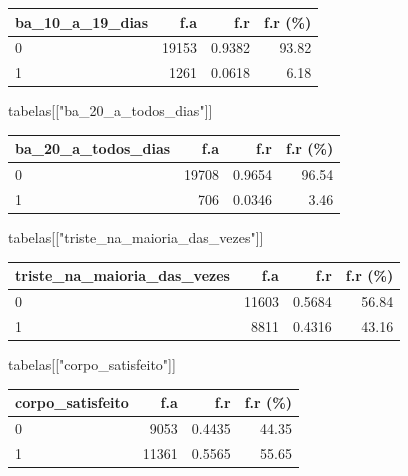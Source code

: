 \documentclass[
]{article}
\newenvironment{Shaded}{\begin{snugshade}}{\end{snugshade}}
\newcommand{\NormalTok}[1]{\textcolor[rgb]{0.00,0.23,0.31}{#1}}
\newcommand{\StringTok}[1]{\textcolor[rgb]{0.13,0.47,0.30}{#1}}
\begin{document}
\begin{longtable}[]{@{}lrrr@{}}
\toprule()
ba\_10\_a\_19\_dias & f.a & f.r & f.r (\%) \\
\midrule()
\endhead
0 & 19153 & 0.9382 & 93.82 \\
1 & 1261 & 0.0618 & 6.18 \\
\bottomrule()
\end{longtable}

\begin{Shaded}
\begin{Highlighting}[]
\NormalTok{tabelas[[}\StringTok{"ba\_20\_a\_todos\_dias"}\NormalTok{]]}
\end{Highlighting}
\end{Shaded}

\begin{longtable}[]{@{}lrrr@{}}
\toprule()
ba\_20\_a\_todos\_dias & f.a & f.r & f.r (\%) \\
\midrule()
\endhead
0 & 19708 & 0.9654 & 96.54 \\
1 & 706 & 0.0346 & 3.46 \\
\bottomrule()
\end{longtable}

\begin{Shaded}
\begin{Highlighting}[]
\NormalTok{tabelas[[}\StringTok{"triste\_na\_maioria\_das\_vezes"}\NormalTok{]]}
\end{Highlighting}
\end{Shaded}

\begin{longtable}[]{@{}lrrr@{}}
\toprule()
triste\_na\_maioria\_das\_vezes & f.a & f.r & f.r (\%) \\
\midrule()
\endhead
0 & 11603 & 0.5684 & 56.84 \\
1 & 8811 & 0.4316 & 43.16 \\
\bottomrule()
\end{longtable}

\begin{Shaded}
\begin{Highlighting}[]
\NormalTok{tabelas[[}\StringTok{"corpo\_satisfeito"}\NormalTok{]]}
\end{Highlighting}
\end{Shaded}

\begin{longtable}[]{@{}lrrr@{}}
\toprule()
corpo\_satisfeito & f.a & f.r & f.r (\%) \\
\midrule()
\endhead
0 & 9053 & 0.4435 & 44.35 \\
1 & 11361 & 0.5565 & 55.65 \\
\bottomrule()
\end{longtable}
\end{document}

